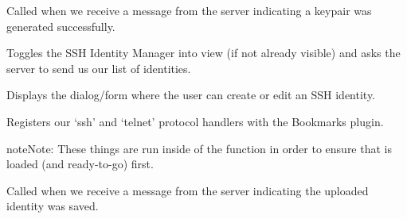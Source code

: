 \documentclass[letterpaper,10pt,openany]{sphinxmanual}
\begin{document}

\begin{fulllineitems}
\label{Applications/terminal/plugin_ssh:GateOne.SSH.keygenComplete}
Called when we receive a message from the server indicating a keypair was generated successfully.

\end{fulllineitems}


\begin{fulllineitems}
\label{Applications/terminal/plugin_ssh:GateOne.SSH.loadIDs}
Toggles the SSH Identity Manager into view (if not already visible) and asks the server to send us our list of identities.

\end{fulllineitems}


\begin{fulllineitems}
\label{Applications/terminal/plugin_ssh:GateOne.SSH.newIDForm}
Displays the dialog/form where the user can create or edit an SSH identity.

\end{fulllineitems}


\begin{fulllineitems}
\label{Applications/terminal/plugin_ssh:GateOne.SSH.postInit}
Registers our `ssh' and `telnet' protocol handlers with the Bookmarks plugin.

\begin{notice}{note}{Note:}
These things are run inside of the  function in order to ensure that  is loaded (and ready-to-go) first.
\end{notice}

\end{fulllineitems}


\begin{fulllineitems}
\label{Applications/terminal/plugin_ssh:GateOne.SSH.saveComplete}
Called when we receive a message from the server indicating the uploaded identity was saved.

\end{fulllineitems}
\end{document}
